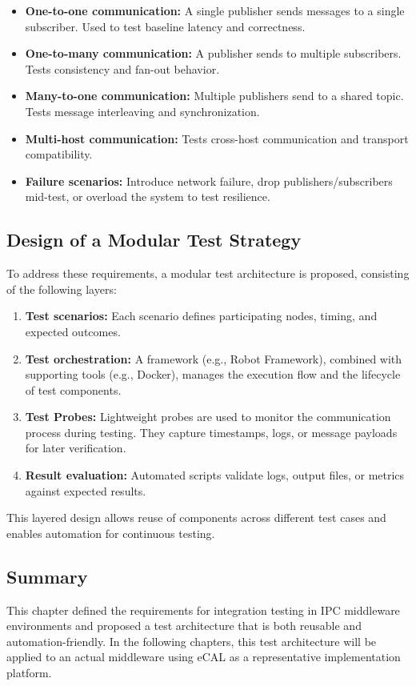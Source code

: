 \begin{itemize}
	\item \textbf{One-to-one communication:} A single publisher sends messages to a single subscriber. Used to test baseline latency and correctness.
	
	\item \textbf{One-to-many communication:} A publisher sends to multiple subscribers. Tests consistency and fan-out behavior.
	
	\item \textbf{Many-to-one communication:} Multiple publishers send to a shared topic. Tests message interleaving and synchronization.
	
	\item \textbf{Multi-host communication:} Tests cross-host communication and transport compatibility.
	
	\item \textbf{Failure scenarios:} Introduce network failure, drop publishers/subscribers mid-test, or overload the system to test resilience.
\end{itemize}

\subsection{Design of a Modular Test Strategy}

To address these requirements, a modular test architecture is proposed, consisting of the following layers:

\begin{enumerate}
	\item \textbf{Test scenarios:} Each scenario defines participating nodes, timing, and expected outcomes.
	\item \textbf{Test orchestration:} A framework (e.g., Robot Framework), combined with supporting tools (e.g., Docker), manages the execution flow and the lifecycle of test components.
	\item \textbf{Test Probes:} Lightweight probes are used to monitor the communication process during testing. They capture timestamps, logs, or message payloads for later verification.
	\item \textbf{Result evaluation:} Automated scripts validate logs, output files, or metrics against expected results.
\end{enumerate}

This layered design allows reuse of components across different test cases and enables automation for continuous testing.

\subsection{Summary}

This chapter defined the requirements for integration testing in IPC middleware environments and proposed a test architecture that is both reusable and automation-friendly. In the following chapters, this test architecture will be applied to an actual middleware using eCAL as a representative implementation platform.


